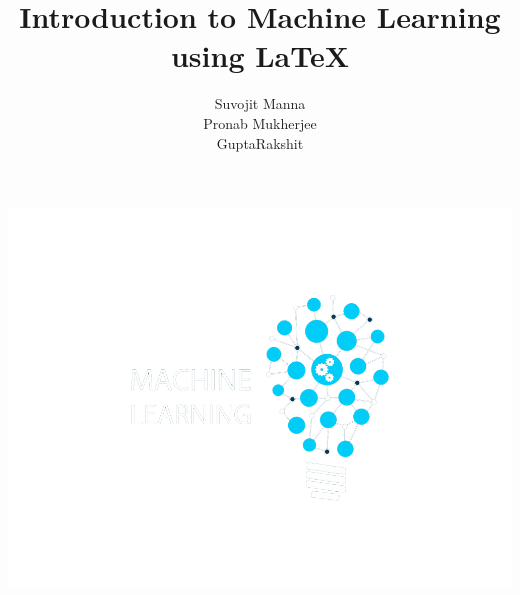 \documentclass[10pt]{beamer}
\begin{document}
\author[Group 9]{Suvojit Manna\\Pronab Mukherjee\\\Barun Gupta\Somnath Rakshit\\}
\title[Machine Learning]{Introduction to Machine Learning using \LaTeX}


\begingroup
{}
\begin{frame}[plain,t]
\hspace*{-22 mm}
\includegraphics[width=\paperwidth,height=\paperheight]{images/ml_bg}
\end{frame}
\endgroup
\end{document}
